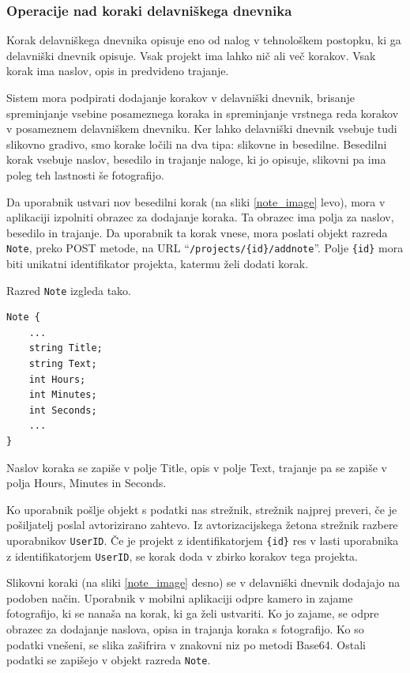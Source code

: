 \documentclass[a4paper, 12pt]{book}
\begin{document}
\subsubsection{Operacije nad koraki delavniškega dnevnika}

Korak delavniškega dnevnika opisuje eno od nalog v tehnološkem postopku, ki ga delavniški dnevnik opisuje.
Vsak projekt ima lahko nič ali več korakov.
Vsak korak ima naslov, opis in predvideno trajanje.

Sistem mora podpirati dodajanje korakov v delavniški dnevnik, brisanje spreminjanje vsebine posameznega koraka in spreminjanje vrstnega reda korakov v posameznem delavniškem dnevniku.
Ker lahko delavniški dnevnik vsebuje tudi slikovno gradivo, smo korake ločili na dva tipa: slikovne in besedilne.
Besedilni korak vsebuje naslov, besedilo in trajanje naloge, ki jo opisuje, slikovni pa ima poleg teh lastnosti še fotografijo.


Da uporabnik ustvari nov besedilni korak (na sliki \ref{note_image} levo), mora v aplikaciji izpolniti obrazec za dodajanje koraka.
Ta obrazec ima polja za naslov, besedilo in trajanje.
Da uporabnik ta korak vnese, mora poslati objekt razreda \texttt{Note}, preko POST metode, na URL \enquote{\texttt{/projects/\{id\}/addnote}}.
Polje \texttt{\{id\}} mora biti unikatni identifikator projekta, katermu želi dodati korak.

\noindent Razred \texttt{Note} izgleda tako.

\begin{verbatim}
Note { 
    ... 
    string Title; 
    string Text; 
    int Hours; 
    int Minutes;
    int Seconds;
    ...
}
\end{verbatim}

Naslov koraka se zapiše v polje Title, opis v polje Text, trajanje pa se zapiše v polja Hours, Minutes in Seconds.

Ko uporabnik pošlje objekt s podatki nas strežnik, strežnik najprej preveri, če je pošiljatelj poslal avtorizirano zahtevo.
Iz avtorizacijskega žetona strežnik razbere uporabnikov \texttt{UserID}. 
Če je projekt z identifikatorjem \texttt{\{id\}} res v lasti uporabnika z identifikatorjem \texttt{UserID}, se korak doda v zbirko korakov tega projekta.

Slikovni koraki (na sliki \ref{note_image} desno) se v delavniški dnevnik dodajajo na podoben način.
Uporabnik v mobilni aplikaciji odpre kamero in zajame fotografijo, ki se nanaša na korak, ki ga želi ustvariti.
Ko jo zajame, se odpre obrazec za dodajanje naslova, opisa in trajanja koraka s fotografijo.
Ko so podatki vnešeni, se slika zašifrira v znakovni niz po metodi Base64.
Ostali podatki se zapišejo v objekt razreda \texttt{Note}.
\end{document}
